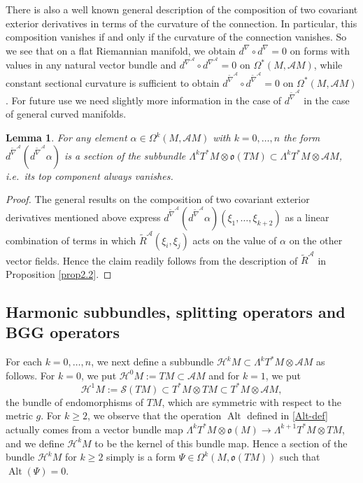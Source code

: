 \documentclass[12pt,a4paper]{amsart}
\def\frak{\mathfrak}
\def\Cal{\mathcal}
\renewcommand{\o}{\circ}
\newcommand{\al}{\alpha}
\newcommand{\La}{\Lambda}
\newcommand{\Om}{\Omega}
\newcommand{\Alt}{\operatorname{Alt}}
\newcommand{\tn}{\widetilde{\nabla}}
\newcounter{theorem}
\numberwithin{theorem}{section}
\numberwithin{equation}{section}
\newtheorem{lemma}[theorem]{Lemma}
\theoremstyle{definition}
\theoremstyle{remark}
\begin{document}
There is also a well known general description of the composition of two covariant
exterior derivatives in terms of the curvature of the connection. In particular, this
composition vanishes if and only if the curvature of the connection vanishes. So we
see that on a flat Riemannian manifold, we obtain $d^\nabla\o d^\nabla=0$ on forms
with values in any natural vector bundle and $d^{\nabla^{\Cal A}}\o d^{\nabla^{\Cal
    A}}=0$ on $\Om^*(M,\Cal AM)$, while constant sectional curvature is sufficient to
obtain  $d^{\tn^{\Cal A}}\o d^{\tn^{\Cal A}}=0$ on $\Om^*(M,\Cal AM)$. For future
use we need slightly more information in the case of $d^{\tn^{\Cal A}}$ in the case
of general curved manifolds.

\begin{lemma}\label{lem2.3}
For any element $\al\in\Om^k(M,\Cal AM)$ with $k=0,\dots,n$ the form $d^{\tn^{\Cal
    A}}(d^{\tn^{\Cal A}}\al)$ is a section of the subbundle $\La^kT^*M\otimes\frak
o(TM)\subset \La^kT^*M\otimes\Cal AM$, i.e.\ its top component always vanishes.
\end{lemma}
\begin{proof}
The general results on the composition of two covariant exterior derivatives
mentioned above express $d^{\tn^{\Cal A}}(d^{\tn^{\Cal
    A}}\al)(\xi_1,\dots,\xi_{k+2})$ as a linear combination of terms in which
$\widetilde{R}^{\Cal A}(\xi_i,\xi_j)$ acts on the value of $\al$ on the other vector
fields. Hence the claim readily follows from the description of $\widetilde{R}^{\Cal
  A}$ in Proposition \ref{prop2.2}.  
\end{proof}

\subsection{Harmonic subbundles, splitting operators and BGG operators}\label{2.4}
For each $k=0,\dots,n$, we next define a subbundle $\Cal
H^kM\subset\La^kT^*M\otimes\Cal AM$ as follows. For $k=0$, we put $\Cal
H^0M:=TM\subset\Cal AM$ and for $k=1$, we put
$$
\Cal H^1M:=\Cal S(TM)\subset T^*M\otimes TM\subset T^*M\otimes\Cal AM,
$$
the bundle of endomorphisms of $TM$, which are symmetric with respect to the metric
$g$. For $k\geq 2$, we observe that the operation $\Alt$ defined in \eqref{Alt-def}
actually comes from a vector bundle map $\La^kT^*M\otimes\frak
o(M)\to\La^{k+1}T^*M\otimes TM$, and we define $\Cal H^kM$ to be the kernel of this
bundle map. Hence a section of the bundle $\Cal H^kM$ for $k\geq 2$ simply is a form
$\Psi\in\Om^k(M,\frak o(TM))$ such that $\Alt(\Psi)=0$.
\end{document}
